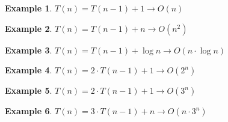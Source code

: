 \documentclass[]{article}
\newtheorem{lem}{Example}[thm]
\begin{document}
\begin{lem}
$T(n) = T(n - 1) + 1 \rightarrow O(n)$
\end{lem}

\begin{lem}
    $T(n) = T(n - 1) + n \rightarrow O(n^2)$
\end{lem}

\begin{lem}
    $T(n) = T(n - 1) + \log{n} \rightarrow O(n\cdot \log{n})$
\end{lem}

\begin{lem}
    $T(n) = 2\cdot T(n - 1) + 1 \rightarrow O(2^n)$
\end{lem}

\begin{lem}
    $T(n) = 2\cdot T(n - 1) + 1 \rightarrow O(3^n)$
\end{lem}
\begin{lem}
    $T(n) = 3\cdot T(n - 1) + n \rightarrow O(n\cdot 3^n)$
\end{lem}
\end{document}
